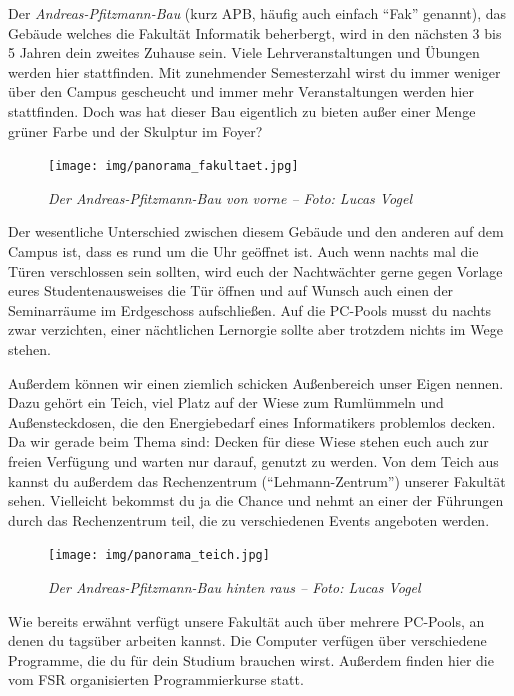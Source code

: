 
Der \emph{Andreas-Pfitzmann-Bau} (kurz APB, häufig auch einfach \enquote{Fak} genannt), das Gebäude welches die Fakultät Informatik beherbergt, wird in den nächsten 3 bis 5 Jahren dein zweites Zuhause sein.
Viele Lehrveranstaltungen und Übungen werden hier stattfinden. Mit zunehmender Semesterzahl wirst du immer weniger über den Campus gescheucht und immer mehr Veranstaltungen werden hier stattfinden.
Doch was hat dieser Bau eigentlich zu bieten außer einer Menge grüner Farbe und der Skulptur im Foyer?

\begin{figure}[h!]
\centering
\texttt{[image: img/panorama\_fakultaet.jpg]}
\caption*{\small \textit{Der Andreas-Pfitzmann-Bau von vorne -- Foto: Lucas Vogel}}
\end{figure}

Der wesentliche Unterschied zwischen diesem Gebäude und den anderen auf dem Campus ist, dass es rund um die Uhr geöffnet ist. Auch wenn nachts mal die Türen verschlossen sein sollten, wird euch der Nachtwächter gerne gegen Vorlage eures Studentenausweises die Tür öffnen und auf Wunsch auch einen der Seminarräume im Erdgeschoss aufschließen.
Auf die PC-Pools musst du nachts zwar verzichten, einer nächtlichen Lernorgie sollte aber trotzdem nichts im Wege stehen.

Außerdem können wir einen ziemlich schicken Außenbereich unser Eigen nennen. Dazu gehört ein Teich, viel Platz auf der Wiese zum Rumlümmeln und Außensteckdosen, die den Energiebedarf eines Informatikers problemlos decken. Da wir gerade beim Thema sind: Decken für diese Wiese stehen euch auch zur freien Verfügung und warten nur darauf, genutzt zu werden.
Von dem Teich aus kannst du außerdem das Rechenzentrum (\enquote{Lehmann-Zentrum}) unserer Fakultät sehen. Vielleicht bekommst du ja die Chance und nehmt an einer der Führungen durch das Rechenzentrum teil, die zu verschiedenen Events angeboten werden.


\pagebreak

\begin{figure}[t]
    \centering
    \texttt{[image: img/panorama\_teich.jpg]}
    \caption*{\small \textit{Der Andreas-Pfitzmann-Bau hinten raus -- Foto: Lucas Vogel}}
\end{figure}

Wie bereits erwähnt verfügt unsere Fakultät auch über mehrere PC-Pools, an denen du tagsüber arbeiten kannst. Die Computer verfügen über verschiedene Programme, die du für dein Studium brauchen wirst. Außerdem finden hier die vom FSR organisierten Programmierkurse statt.

